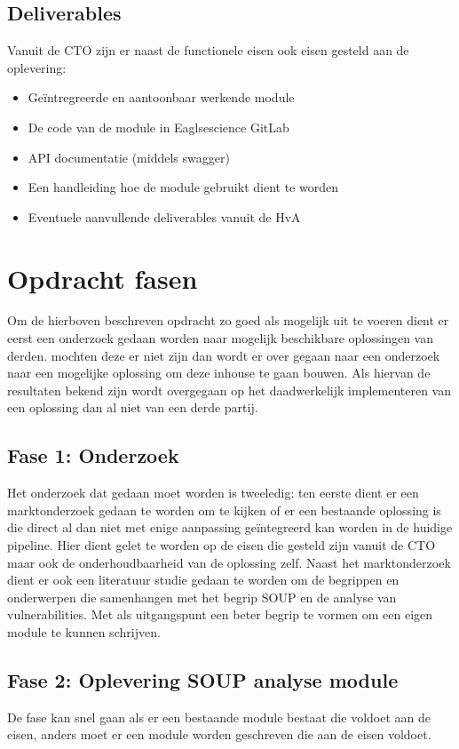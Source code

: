 \subsection{Deliverables}
Vanuit de CTO zijn er naast de functionele eisen ook eisen gesteld aan de oplevering:
\begin{itemize}
\item Geïntregreerde en aantoonbaar werkende module
\item De code van de module in Eaglsescience GitLab
\item API documentatie (middels swagger)
\item Een handleiding hoe de module gebruikt dient te worden
\item Eventuele aanvullende deliverables vanuit de HvA
\end{itemize}


\section{Opdracht fasen}

Om de hierboven beschreven opdracht zo goed als mogelijk uit te voeren dient er eerst een onderzoek gedaan worden naar mogelijk beschikbare oplossingen van derden.
mochten deze er niet zijn dan wordt er over gegaan naar een onderzoek naar een mogelijke oplossing om deze inhouse te gaan bouwen. Als hiervan de resultaten bekend zijn wordt overgegaan op het daadwerkelijk implementeren van een oplossing dan al niet van een derde partij. 

\subsection{Fase 1: Onderzoek}
Het onderzoek dat gedaan moet worden is tweeledig: ten eerste dient er een marktonderzoek gedaan te worden om te kijken of er een bestaande oplossing is die direct al dan niet met enige aanpassing ge\"integreerd kan worden in de huidige pipeline. Hier dient gelet te worden op de eisen die gesteld zijn vanuit de CTO maar ook de onderhoudbaarheid van de oplossing zelf.
Naast het marktonderzoek dient er ook een literatuur studie gedaan te worden om de begrippen en onderwerpen die samenhangen met het begrip SOUP en de analyse van vulnerabilities. Met als uitgangspunt een beter begrip te vormen om een eigen module te kunnen schrijven. 


\subsection{Fase 2: Oplevering SOUP analyse module}
De fase kan snel gaan als er een bestaande module bestaat die voldoet aan de eisen, anders moet er een module worden geschreven die aan de eisen voldoet. 

